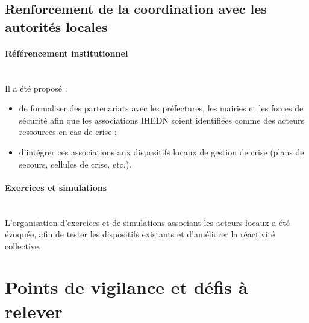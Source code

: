 \documentclass[12pt,a4paper]{article}
\begin{document}

\subsection{Renforcement de la coordination avec les autorités locales}

\paragraph{Référencement institutionnel}
~\\
Il a été proposé :

\begin{itemize}
    \item de formaliser des partenariats avec les préfectures, les mairies et les forces de sécurité afin que les associations IHEDN soient identifiées comme des acteurs ressources en cas de crise ;
    \item d'intégrer ces associations aux dispositifs locaux de gestion de crise (plans de secours, cellules de crise, etc.).
\end{itemize}

\paragraph{Exercices et simulations}
~\\
L'organisation d'exercices et de simulations associant les acteurs locaux a été évoquée, afin de tester les dispositifs existants et d'améliorer la réactivité collective.

\newpage

\section{Points de vigilance et défis à relever}
\end{document}
